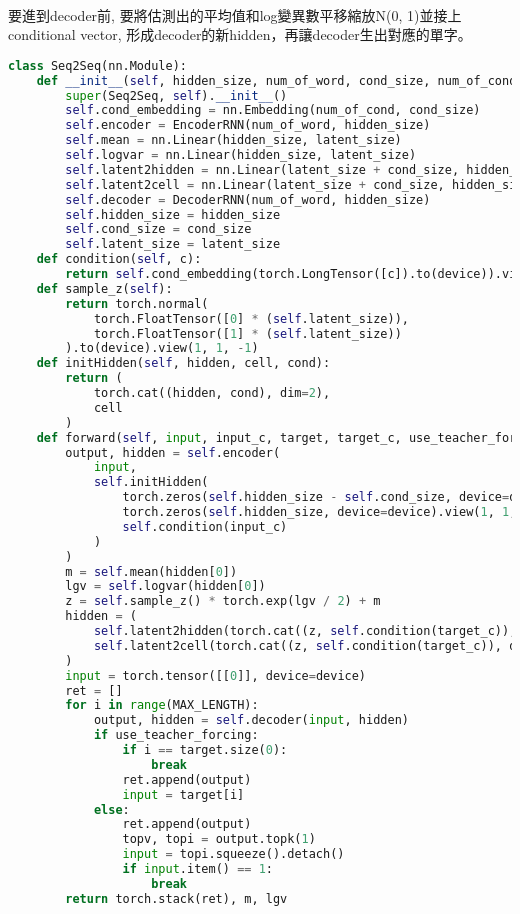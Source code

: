 \paragraph{}
要進到decoder前, 要將估測出的平均值和log變異數平移縮放N(0, 1)並接上conditional vector, 形成decoder的新hidden，再讓decoder生出對應的單字。
\begin{lstlisting}[language=Python]
class Seq2Seq(nn.Module):
    def __init__(self, hidden_size, num_of_word, cond_size, num_of_cond, latent_size):
        super(Seq2Seq, self).__init__()
        self.cond_embedding = nn.Embedding(num_of_cond, cond_size)
        self.encoder = EncoderRNN(num_of_word, hidden_size)
        self.mean = nn.Linear(hidden_size, latent_size)
        self.logvar = nn.Linear(hidden_size, latent_size)
        self.latent2hidden = nn.Linear(latent_size + cond_size, hidden_size)
        self.latent2cell = nn.Linear(latent_size + cond_size, hidden_size)
        self.decoder = DecoderRNN(num_of_word, hidden_size)
        self.hidden_size = hidden_size
        self.cond_size = cond_size
        self.latent_size = latent_size
    def condition(self, c):
        return self.cond_embedding(torch.LongTensor([c]).to(device)).view(1, 1, -1)
    def sample_z(self):
        return torch.normal(
            torch.FloatTensor([0] * (self.latent_size)),
            torch.FloatTensor([1] * (self.latent_size))
        ).to(device).view(1, 1, -1)
    def initHidden(self, hidden, cell, cond):
        return (
            torch.cat((hidden, cond), dim=2),
            cell
        )
    def forward(self, input, input_c, target, target_c, use_teacher_forcing):
        output, hidden = self.encoder(
            input,
            self.initHidden(
                torch.zeros(self.hidden_size - self.cond_size, device=device).view(1, 1, -1),
                torch.zeros(self.hidden_size, device=device).view(1, 1, -1),
                self.condition(input_c)
            )
        )
        m = self.mean(hidden[0])
        lgv = self.logvar(hidden[0])
        z = self.sample_z() * torch.exp(lgv / 2) + m
        hidden = (
            self.latent2hidden(torch.cat((z, self.condition(target_c)), dim=2).reshape(-1)).view(1, 1, -1),
            self.latent2cell(torch.cat((z, self.condition(target_c)), dim=2).reshape(-1)).view(1, 1, -1)
        )
        input = torch.tensor([[0]], device=device)
        ret = []
        for i in range(MAX_LENGTH):
            output, hidden = self.decoder(input, hidden)
            if use_teacher_forcing:
                if i == target.size(0):
                    break
                ret.append(output)
                input = target[i]
            else:
                ret.append(output)
                topv, topi = output.topk(1)
                input = topi.squeeze().detach()
                if input.item() == 1:
                    break
        return torch.stack(ret), m, lgv
\end{lstlisting}
